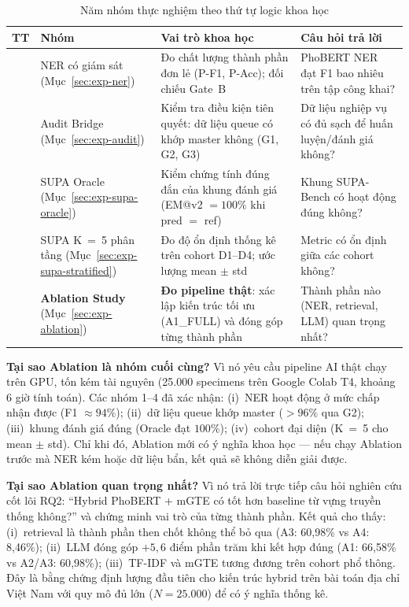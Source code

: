 \begin{table}[H]
\centering
\caption{Năm nhóm thực nghiệm theo thứ tự logic khoa học}
\label{tab:exp-strategy}
\small
\begin{tabularx}{\linewidth}{>{\raggedright\arraybackslash}p{0.8cm} >{\raggedright\arraybackslash}p{3.2cm} >{\raggedright\arraybackslash}X >{\raggedright\arraybackslash}p{2.8cm}}
\toprule
\textbf{TT} & \textbf{Nhóm} & \textbf{Vai trò khoa học} & \textbf{Câu hỏi trả lời} \\
\midrule
1 & NER có giám sát (Mục~\ref{sec:exp-ner}) & Đo chất lượng thành phần đơn lẻ (P-F1, P-Acc); đối chiếu Gate~B & PhoBERT NER đạt F1 bao nhiêu trên tập công khai? \\
2 & Audit Bridge (Mục~\ref{sec:exp-audit}) & Kiểm tra điều kiện tiên quyết: dữ liệu queue có khớp master không (G1, G2, G3) & Dữ liệu nghiệp vụ có đủ sạch để huấn luyện/đánh giá không? \\
3 & SUPA Oracle (Mục~\ref{sec:exp-supa-oracle}) & Kiểm chứng tính đúng đắn của khung đánh giá (EM@v2 \(= 100\%\) khi pred \(=\) ref) & Khung SUPA-Bench có hoạt động đúng không? \\
4 & SUPA K~=~5 phân tầng (Mục~\ref{sec:exp-supa-stratified}) & Đo độ ổn định thống kê trên cohort D1--D4; ước lượng mean \(\pm\) std & Metric có ổn định giữa các cohort không? \\
5 & \textbf{Ablation Study} (Mục~\ref{sec:exp-ablation}) & \textbf{Đo pipeline thật}: xác lập kiến trúc tối ưu (A1\_FULL) và đóng góp từng thành phần & Thành phần nào (NER, retrieval, LLM) quan trọng nhất? \\
\bottomrule
\end{tabularx}
\end{table}

\textbf{Tại sao Ablation là nhóm cuối cùng?} Vì nó yêu cầu pipeline AI thật chạy trên GPU, tốn kém tài nguyên (25.000 specimens trên Google Colab T4, khoảng 6 giờ tính toán). Các nhóm 1--4 đã xác nhận: (i)~NER hoạt động ở mức chấp nhận được (F1 \(\approx 94\%\)); (ii)~dữ liệu queue khớp master (\(> 96\%\) qua G2); (iii)~khung đánh giá đúng (Oracle đạt \(100\%\)); (iv)~cohort đại diện (K~=~5 cho mean \(\pm\) std). Chỉ khi đó, Ablation mới có ý nghĩa khoa học --- nếu chạy Ablation trước mà NER kém hoặc dữ liệu bẩn, kết quả sẽ không diễn giải được.

\textbf{Tại sao Ablation quan trọng nhất?} Vì nó trả lời trực tiếp câu hỏi nghiên cứu cốt lõi RQ2: ``Hybrid PhoBERT + mGTE có tốt hơn baseline từ vựng truyền thống không?'' và chứng minh vai trò của từng thành phần. Kết quả cho thấy: (i)~retrieval là thành phần then chốt không thể bỏ qua (A3: 60{,}98\% vs A4: 8{,}46\%); (ii)~LLM đóng góp \(+5{,}6\) điểm phần trăm khi kết hợp đúng (A1: 66{,}58\% vs A2/A3: 60{,}98\%); (iii)~TF-IDF và mGTE tương đương trên cohort phổ thông. Đây là bằng chứng định lượng đầu tiên cho kiến trúc hybrid trên bài toán địa chỉ Việt Nam với quy mô đủ lớn (\(N = 25.000\)) để có ý nghĩa thống kê.

